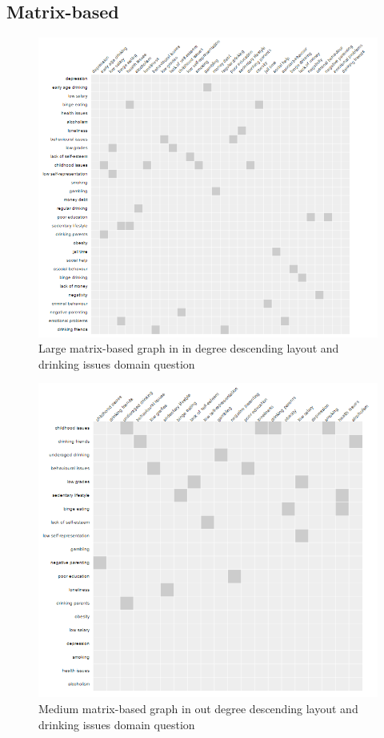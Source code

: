 \documentclass{l4proj}
\begin{document}
\begin{appendices}
\subsection{Matrix-based}

\begin{figure}[H]
\centering
\includegraphics[width=16cm]{images/drinkingLargeInDD.PNG}
\caption{Large matrix-based graph in in degree descending layout and drinking issues domain question}
\label{drinkingLargeInDD}
\end{figure}


\begin{figure}[H]
\centering
\includegraphics[width=16cm]{images/drinkingMedOutDD.PNG}
\caption{Medium matrix-based graph in out degree descending layout and drinking issues domain question}
\label{drinkingMedOutDD}
\end{figure}


\end{appendices}
\end{document}
